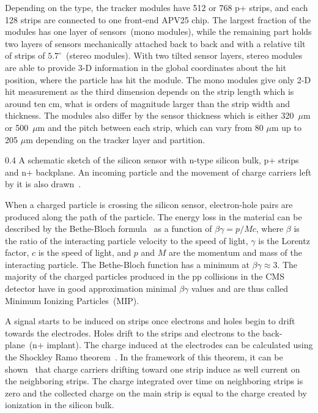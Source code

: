 Depending on the type, the tracker modules have 512 or 768 p+ strips, and each 128 strips are connected to one front-end APV25 chip. The largest fraction of the modules has one layer of sensors~(mono modules), while the remaining part holds two layers of sensors  mechanically attached back to back and with a relative tilt of strips of $5.7^{\circ}$~(stereo modules). With two tilted sensor layers, stereo modules are able to provide 3-D information in the global coordinates about the hit position, where the particle has hit the module. The mono modules give only 2-D hit measurement as the third dimension depends on the strip length which is around ten cm, what is orders of magnitude larger than the strip width and thickness. The modules also differ by the sensor thickness which is either 320~$\mu$m or 500~$\mu$m and the pitch between each strip, which can vary from 80 $\mu$m up to 205 $\mu$m depending on the tracker layer and partition.

                 {0.4}       %
                 {A schematic sketch of the silicon sensor with n-type silicon bulk, p+ strips and n+ backplane. An incoming particle and the movement of charge carriers left by it is also drawn~\cite{website:sensor}. } %

When a charged particle is crossing the silicon sensor, electron-hole pairs are produced along the path of the particle. The energy loss in the material can be described by the Bethe-Bloch formula~\cite{Groom:2000sm} as a function of $\beta\gamma = p/Mc$, where $\beta$ is the ratio of the interacting particle velocity to the speed of light, $\gamma$ is the Lorentz factor, $c$ is the speed of light, and $p$ and $M$ are the momentum and mass of the interacting particle. The Bethe-Bloch function has a minimum at $\beta\gamma \approx 3$. The majority of the charged particles produced in the pp collisions in the CMS detector have in good approximation minimal $\beta\gamma$ values and are thus called Minimum Ionizing Particles~(MIP).

A signal starts to be induced on strips once electrons and holes begin to drift towards the electrodes. Holes drift to the strips and electrons to the back-plane~(n+ implant). The charge induced at the electrodes can be calculated using the Shockley Ramo theorem~\cite{doi:10.1063/1.1710367,Ramo:1939vr}. In the framework of this theorem, it can be shown~\cite{Bloch:2007zza} that charge carriers drifting toward one strip induce as well current on the neighboring strips. The charge integrated over time on neighboring strips is zero and the collected charge on the main strip is equal to the charge created by ionization in the silicon bulk.

